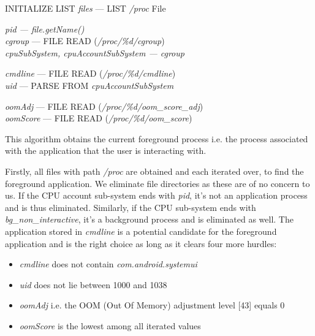 \documentclass[12pt]{uthesis-v12}  %
\begin{document}
			\begin{algorithm}[H]
				\SetAlgoLined
				
				INITIALIZE LIST {\em files} --- LIST {\em /proc} File\\
				{
					
					{\em pid --- file.getName()}\\
					{\em cgroup} --- FILE READ ({\em /proc/\%d/cgroup})\\
					{\em cpuSubSystem, cpuAccountSubSystem --- cgroup}\\
					
					
					{\em cmdline} --- FILE READ ({\em /proc/\%d/cmdline})\\
					{\em uid} --- PARSE FROM {\em cpuAccountSubSystem}\\
					
					
					{\em oomAdj} --- FILE READ ({\em /proc/\%d/oom\_score\_adj})\\
					{\em oomScore} --- FILE READ ({\em /proc/\%d/oom\_score})\\
					
				}
				
				\caption[Algorithm to get current foreground application]{This algorithm obtains the current foreground process i.e. the process associated with the application that the user is interacting with.}
			\end{algorithm}
			
			Firstly, all files with path {\em /proc} are obtained and each iterated over, to find the foreground application. We eliminate file directories as these are of no concern to us. If the CPU account sub-system ends with {\em pid}, it's not an application process and is thus eliminated. Similarly, if the CPU sub-system ends with {\em bg\_non\_interactive}, it's a background process and is eliminated as well. The application stored in {\em cmdline} is a potential candidate for the foreground application and is the right choice as long as it clears four more hurdles:
			
			\begin{itemize}
				\item {\em cmdline} does not contain {\em com.android.systemui}
				\item {\em uid} does not lie between 1000 and 1038
				\item {\em oomAdj} i.e. the OOM (Out Of Memory) adjustment level [43] equals 0
				\item {\em oomScore} is the lowest among all iterated values
			\end{itemize}
			
\end{document}
